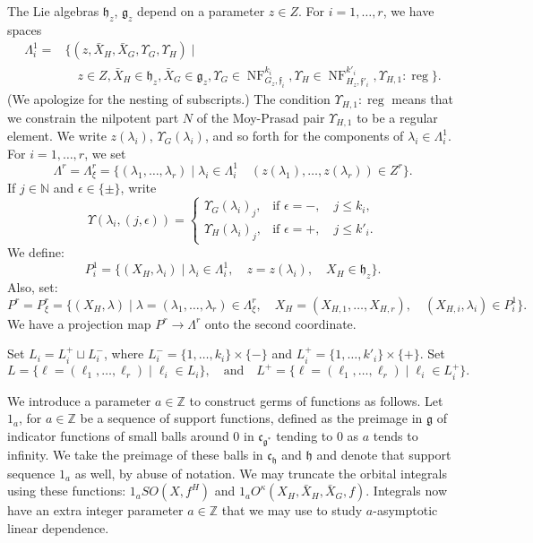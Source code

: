 \documentclass[12pt]{amsart}
\newcommand{\op}[1]{\operatorname{#1}}
\newcommand{\ring}[1]{{\mathbb #1}}
\def\NF{\op{NF}}
\def\Y{\Upsilon}
\def\s{{\mathfrak{f}}}
\newcommand{\fg}{\mathfrak{g}}
\newcommand{\fc}{\mathfrak{c}}
\newcommand{\fh}{\mathfrak{h}}
\theoremstyle{plain}
\theoremstyle{definition}
\begin{document}
The Lie algebras $\fh_z$, $\fg_z$ depend on a parameter $z\in Z$.
For $i=1,\ldots,r$, we have spaces
\begin{align*}
\Lambda^1_i = &\{(z,\bar X_H,\bar X_G,\Y_G,\Y_H) \mid \\
     &\quad z\in Z, 
\bar X_H \in \fh_z, \bar X_G\in \fg_z, 
\Y_G\in \NF^{k_i}_{G_z,\s_i}, \Y_H\in \NF^{k'_i}_{H_z,\s'_i}, \Y_{H,1}:\op{reg}\}.
\end{align*}
(We apologize for the nesting of subscripts.)  The condition
$\Y_{H,1}:\op{reg}$ means that we constrain the nilpotent part $N$ of
the Moy-Prasad pair $\Y_{H,1}$ to be a regular element.  We write
$z(\lambda_i)$, $\Y_G(\lambda_i)$, and so forth for the components of
$\lambda_i\in\Lambda^1_i$.  For $i=1,\ldots,r$, we set
\[
\Lambda^r = \Lambda^r_\xi = 
\{(\lambda_1,\ldots,\lambda_r) \mid \lambda_i \in \Lambda^1_i\quad
  (z(\lambda_1),\ldots,z(\lambda_r))\in Z^r \}.
\]
If $j\in\ring{N}$ and $\epsilon\in\{\pm\}$, write
\[
\Y(\lambda_i,(j,\epsilon)) = 
\begin{cases}
\Y_G(\lambda_i)_j,&\text{if }\epsilon= -,\quad j\le k_i,\\
\Y_H(\lambda_i)_j,&\text{if }\epsilon= +,\quad j\le k'_i.
\end{cases}
\]
We
define:
\[
P^1_i = \{(X_H,\lambda_i) \mid \lambda_i\in \Lambda^1_i,
\quad z = z(\lambda_i),\quad X_H \in \fh_z\}.
\]
Also, set:
\[
P^r = P^r_\xi = \{(X_H,\lambda) \mid \lambda = 
(\lambda_1,\ldots,\lambda_r)\in \Lambda^r_\xi,\quad
  X_H = (X_{H,1},\ldots,X_{H,r}), \quad (X_{H,i},\lambda_i) \in P^1_i\}.
\]
We have a projection map $P^r\to \Lambda^r$ onto the second coordinate.

Set
$L_i = L^+_i\sqcup L^-_i$, where $L^-_i =
\{1,\ldots,k_i\}\times\{-\}$ and $L^+_i =
\{1,\ldots,k'_i\}\times\{+\}$.
Set
\[
L = \{\ell = (\ell_1,\ldots,\ell_r)\mid \ell_i\in L_i\},\quad\text{and}\quad
L^+ = \{\ell = (\ell_1,\ldots,\ell_r)\mid \ell_i\in L^+_i\}.
\]

We introduce a parameter $a\in\ring{Z}$ to construct germs of
functions as follows.  Let $1_a$, for $a\in\ring{Z}$ be a sequence of
support functions, defined as the preimage in $\fg$ of indicator
functions of small balls around $0$ in $\fc_{\fg^*}$ tending to $0$ as
$a$ tends to infinity.  We take the preimage of these balls in
$\fc_{\fh}$ and $\fh$ and denote that support sequence $1_a$ as well,
by abuse of notation.  We may truncate the orbital integrals using
these functions: $1_a SO(X,f^H)$ and $1_a O^\kappa(X_H,\bar
X_H,\bar X_G,f)$.  Integrals now have an extra integer parameter
$a\in\ring{Z}$ that we may use to study $a$-asymptotic linear
dependence.  
\end{document}
